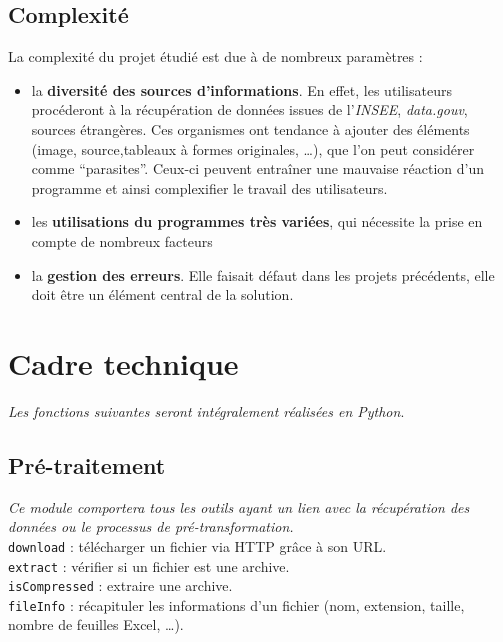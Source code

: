 \documentclass[french,12pt]{report}
\begin{document}
\begin{normalsize}
   \section{Complexité}
   
\noindent La complexité du projet étudié est due à de nombreux paramètres :
   \begin{itemize}
\item la \textbf{diversité des sources d’informations}. En effet, les utilisateurs procéderont à la récupération de données issues de l’\textit{INSEE}, \textit{data.gouv}, sources étrangères. Ces organismes ont tendance à ajouter des éléments (image, source,tableaux à formes originales, …), que l’on peut considérer comme “parasites”. Ceux-ci peuvent entraîner une mauvaise réaction d’un programme et ainsi complexifier le travail des utilisateurs.

\item  les \textbf{utilisations du programmes très variées}, qui nécessite la prise en compte de nombreux facteurs
\item la \textbf{gestion des erreurs}. Elle faisait défaut dans les projets précédents, elle doit être un élément central de la solution.
\end{itemize}
   \chapter{Cadre technique}\label{cadre-technique}
   \noindent \textit{Les fonctions suivantes seront intégralement réalisées en Python}.
   \section{Pré-traitement}
\noindent \textit{Ce module comportera tous les outils ayant un lien avec la récupération des données ou le processus de pré-transformation.}\\


\texttt{download} : télécharger un fichier via HTTP grâce à son URL.\\

\texttt{extract} : vérifier si un fichier est une archive.\\

\texttt{isCompressed} : extraire une archive.\\

\texttt{fileInfo} : récapituler les informations d’un fichier (nom, extension, taille, nombre de feuilles Excel, …).\\


\end{normalsize}
\end{document}
